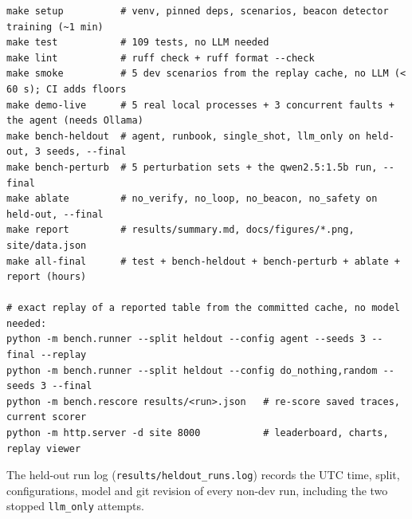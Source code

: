 \documentclass[11pt,a4paper]{article}
\newcommand{\code}[1]{\texttt{#1}}
\begin{document}
\begin{tcolorbox}[enhanced,colback=keyfill,colframe=accent!60,boxrule=0.5pt,arc=2pt,left=6pt,right=6pt]
\scriptsize\begin{verbatim}
make setup          # venv, pinned deps, scenarios, beacon detector training (~1 min)
make test           # 109 tests, no LLM needed
make lint           # ruff check + ruff format --check
make smoke          # 5 dev scenarios from the replay cache, no LLM (< 60 s); CI adds floors
make demo-live      # 5 real local processes + 3 concurrent faults + the agent (needs Ollama)
make bench-heldout  # agent, runbook, single_shot, llm_only on held-out, 3 seeds, --final
make bench-perturb  # 5 perturbation sets + the qwen2.5:1.5b run, --final
make ablate         # no_verify, no_loop, no_beacon, no_safety on held-out, --final
make report         # results/summary.md, docs/figures/*.png, site/data.json
make all-final      # test + bench-heldout + bench-perturb + ablate + report (hours)

# exact replay of a reported table from the committed cache, no model needed:
python -m bench.runner --split heldout --config agent --seeds 3 --final --replay
python -m bench.runner --split heldout --config do_nothing,random --seeds 3 --final
python -m bench.rescore results/<run>.json   # re-score saved traces, current scorer
python -m http.server -d site 8000           # leaderboard, charts, replay viewer
\end{verbatim}
\end{tcolorbox}

The held-out run log (\code{results/heldout\_runs.log}) records the UTC time, split, configurations,
model and git revision of every non-dev run, including the two stopped \code{llm\_only} attempts.

\clearpage
\end{document}
